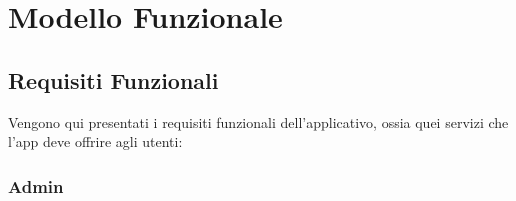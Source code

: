 \section{Modello Funzionale}
    \subsection{Requisiti Funzionali}
        \begin{flushleft}  
            {\large
                Vengono qui presentati i requisiti funzionali dell'applicativo, ossia quei servizi che l'app  deve offrire agli utenti:
            } 
        \end{flushleft}
        
        \subsubsection{Admin}
        
